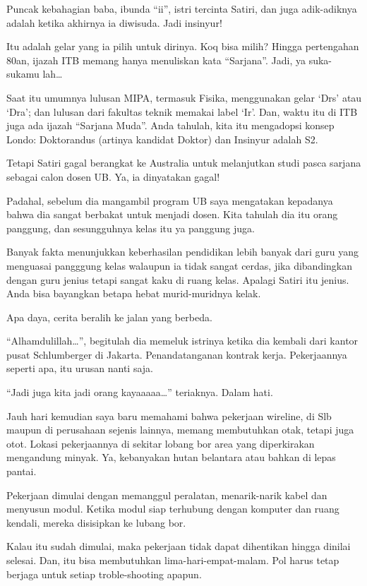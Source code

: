 Puncak kebahagian baba, ibunda “ii”, istri tercinta Satiri, dan juga adik-adiknya adalah ketika akhirnya ia diwisuda. Jadi insinyur!

Itu adalah gelar yang ia pilih untuk dirinya. Koq bisa milih? Hingga pertengahan 80an, ijazah ITB memang hanya menuliskan kata “Sarjana”. Jadi, ya suka-sukamu lah…

Saat itu umumnya lulusan MIPA, termasuk Fisika, menggunakan gelar ‘Drs’ atau ‘Dra’; dan lulusan dari fakultas teknik memakai label ‘Ir’. Dan, waktu itu di ITB juga ada ijazah “Sarjana Muda”. Anda tahulah, kita itu mengadopsi konsep Londo: Doktorandus (artinya kandidat Doktor) dan Insinyur adalah S2.

Tetapi Satiri gagal berangkat ke Australia untuk melanjutkan studi pasca sarjana sebagai calon dosen UB. Ya, ia dinyatakan gagal!

Padahal, sebelum dia mangambil program UB saya mengatakan kepadanya bahwa dia sangat berbakat untuk menjadi dosen. Kita tahulah dia itu orang panggung, dan sesungguhnya kelas itu ya panggung juga.

Banyak fakta menunjukkan keberhasilan pendidikan lebih banyak dari guru yang menguasai pangggung kelas walaupun ia tidak sangat cerdas, jika dibandingkan dengan guru jenius tetapi sangat kaku di ruang kelas. Apalagi Satiri itu jenius. Anda bisa bayangkan betapa hebat murid-muridnya kelak.

Apa daya, cerita beralih ke jalan yang berbeda.

“Alhamdulillah…”, begitulah dia memeluk istrinya ketika dia kembali dari kantor pusat Schlumberger di Jakarta. Penandatanganan kontrak kerja. Pekerjaannya seperti apa, itu urusan nanti saja.

“Jadi juga kita jadi orang kayaaaaa…” teriaknya. Dalam hati.

Jauh hari kemudian saya baru memahami bahwa pekerjaan wireline, di Slb maupun di perusahaan sejenis lainnya, memang membutuhkan otak, tetapi juga otot. Lokasi pekerjaannya di sekitar lobang bor area yang diperkirakan mengandung minyak. Ya, kebanyakan hutan belantara atau bahkan di lepas pantai.

Pekerjaan dimulai dengan memanggul peralatan, menarik-narik kabel dan menyusun modul. Ketika modul siap terhubung dengan komputer dan ruang kendali, mereka disisipkan ke lubang bor.

Kalau itu sudah dimulai, maka pekerjaan tidak dapat dihentikan hingga dinilai selesai. Dan, itu bisa membutuhkan lima-hari-empat-malam. Pol harus tetap berjaga untuk setiap troble-shooting apapun.

